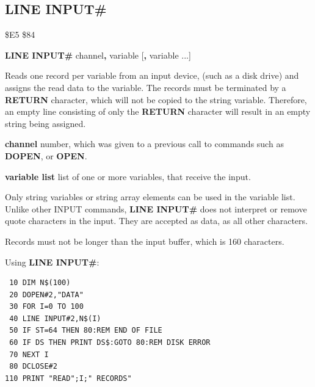 \subsection{LINE INPUT\#}
\begin{description}[leftmargin=2cm,style=nextline]
\item [Token:] \$E5 \$84
\item [Format:] {\bf LINE INPUT\#} channel{\bf,} variable [{\bf,} variable ...]
\item [Usage:] Reads one record per variable from an input device,
              (such as a disk drive)
               and assigns the read data to the variable.
               The records must be terminated by a {\bf RETURN}
               character, which will not be copied to the string variable.
               Therefore, an empty line consisting of only the {\bf RETURN} character
               will result in an empty string being assigned.

               {\bf channel} number, which was given to a previous
               call to commands such as {\bf DOPEN}, or {\bf OPEN}.

               {\bf variable list} list of one or more
               variables, that receive the input.

\item [Remarks:] Only string variables or string array elements
                 can be used in the variable list.
                 Unlike other INPUT commands, {\bf LINE INPUT\#} does
                 not interpret or remove quote characters in the input.
                 They are accepted as data, as all other characters.

                 Records must not be longer than the input buffer, which is 160 characters.

\item [Example:] Using {\bf LINE INPUT\#}:
\begin{tcolorbox}[colback=black,coltext=white]
\verbatimfont{\codefont}
\begin{verbatim}
 10 DIM N$(100)
 20 DOPEN#2,"DATA"
 30 FOR I=0 TO 100
 40 LINE INPUT#2,N$(I)
 50 IF ST=64 THEN 80:REM END OF FILE
 60 IF DS THEN PRINT DS$:GOTO 80:REM DISK ERROR
 70 NEXT I
 80 DCLOSE#2
110 PRINT "READ";I;" RECORDS"
\end{verbatim}
\end{tcolorbox}
\end{description}

\label{basic65-list}
\newpage
